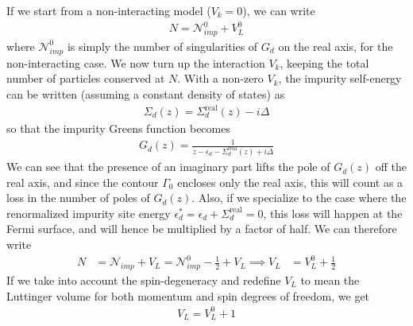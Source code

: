 \documentclass[10pt]{report}
\numberwithin{equation}{section}
\begin{document}
If we start from a non-interacting model (\(V_k = 0\)), we can write
\begin{equation}\begin{aligned}
	N = \mathcal{N}^0_{imp} + V_L^0
\end{aligned}\end{equation}
where \(\mathcal{N}^0_{imp}\) is simply the number of singularities of \(G_d\) on the real axis, for the non-interacting case. We now turn up the interaction \(V_k\), keeping the total number of particles conserved at \(N\). With a non-zero \(V_k\), the impurity self-energy can be written (assuming a constant density of states) as
\begin{equation}\begin{aligned}
	\Sigma_d(z) = \Sigma_d^\text{real}(z) - i \Delta
\end{aligned}\end{equation}
so that the impurity Greens function becomes
\begin{equation}\begin{aligned}
	G_d(z) = \frac{1}{z - \epsilon_d - \Sigma_d^\text{real}(z) + i \Delta}
\end{aligned}\end{equation}
We can see that the presence of an imaginary part lifts the pole of \(G_d(z)\) off the real axis, and since the contour \(\Gamma_0\) encloses only the real axis, this will count as a loss in the number of poles of \(G_d(z)\). Also, if we specialize to the case where the renormalized impurity site energy \(\epsilon_d^* = \epsilon_d + \Sigma_d^\text{real} = 0\), this loss will happen at the Fermi surface, and will hence be multiplied by a factor of half. We can therefore write
\begin{equation}\begin{aligned}
	N &= \mathcal{N}_{imp} + V_L = \mathcal{N}^0_{imp} - \frac{1}{2} + V_L \implies V_L &= V_L^0 + \frac{1}{2}
\end{aligned}\end{equation}
If we take into account the spin-degeneracy and redefine \(V_L\) to mean the Luttinger volume for both momentum and spin degrees of freedom, we get
\begin{equation}\begin{aligned}
	\label{luttinger_change}
	V_L = V_L^0 + 1
\end{aligned}\end{equation}
\end{document}
